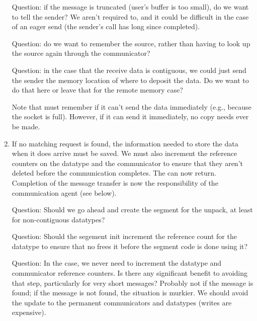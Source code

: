 \begin{enumerate}
  Question: if the message is truncated (user's buffer is too small), do 
  we want to tell the sender?  We aren't required to, and it could be
  difficult in the case of an eager send (the sender's call has long since
  completed).  

  Question: do we want to remember the source, rather than having to look up
  the source again through the communicator?

  Question: in the case that the receive data is contiguous, we could just
  send the sender the memory location of where to deposit the data.  Do we
  want to do that here or leave that for the remote memory case?

  Note that  must remember  if it can't send
  the data immediately (e.g., because the socket is full).  However, if it can
  send it immediately, no copy needs ever be made.

\item If no matching request is found, the information needed to store the data
  when it does arrive must be saved.  We must also increment the reference
  counters on the datatype and the communicator to ensure that they aren't
  deleted before the communication completes.
  The  can now return.  Completion of the message transfer
  is now the responsibility of the communication agent (see below). 

  Question: Should we go ahead and create the segment for the unpack, at least
  for non-contiguous datatypes?

  Question: Should the segement init increment the reference count for the
  datatype to ensure that no  frees it before the
  segment code is done using it?

  Question: In the  case, we never need to increment the
  datatype and communicator reference counters.  Is there any significant 
  benefit to avoiding that step, particularly for very short messages?
  Probably not if the message is found; if the message is not found, the
  situation is murkier.  We should avoid the update to the permanent
  communicators and datatypes (writes are expensive).
\end{enumerate}

\ifcodefirst
\else
{}
\fi


\ifcodefirst
{}
\fi

